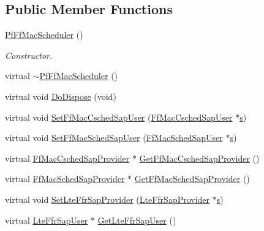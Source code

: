 \subsection*{Public Member Functions}
\begin{DoxyCompactItemize}
\item 
\hyperlink{classns3_1_1PfFfMacScheduler_ad972377fd4997d9bf0b8193e69f20a16}{Pf\+Ff\+Mac\+Scheduler} ()
\begin{DoxyCompactList}\small\item\em Constructor. \end{DoxyCompactList}\item 
virtual \hyperlink{classns3_1_1PfFfMacScheduler_a5393a928efa6e15a722b4017ce6e1722}{$\sim$\+Pf\+Ff\+Mac\+Scheduler} ()
\item 
virtual void \hyperlink{classns3_1_1PfFfMacScheduler_a8dcc458e09d58658d878ac38e6ab53b2}{Do\+Dispose} (void)
\item 
virtual void \hyperlink{classns3_1_1PfFfMacScheduler_a321a45d0b943975e8a4d6864e7d1c77a}{Set\+Ff\+Mac\+Csched\+Sap\+User} (\hyperlink{classns3_1_1FfMacCschedSapUser}{Ff\+Mac\+Csched\+Sap\+User} $\ast$\hyperlink{generate__test__data__lte__sinr_8m_ad83eeb3a142285d1243a08c6b7026df8}{s})
\item 
virtual void \hyperlink{classns3_1_1PfFfMacScheduler_a8a140242b29416a972e7cbec6437dda6}{Set\+Ff\+Mac\+Sched\+Sap\+User} (\hyperlink{classns3_1_1FfMacSchedSapUser}{Ff\+Mac\+Sched\+Sap\+User} $\ast$\hyperlink{generate__test__data__lte__sinr_8m_ad83eeb3a142285d1243a08c6b7026df8}{s})
\item 
virtual \hyperlink{classns3_1_1FfMacCschedSapProvider}{Ff\+Mac\+Csched\+Sap\+Provider} $\ast$ \hyperlink{classns3_1_1PfFfMacScheduler_abcd84721f95e8b9d01fb8f54f58b906b}{Get\+Ff\+Mac\+Csched\+Sap\+Provider} ()
\item 
virtual \hyperlink{classns3_1_1FfMacSchedSapProvider}{Ff\+Mac\+Sched\+Sap\+Provider} $\ast$ \hyperlink{classns3_1_1PfFfMacScheduler_a14eca80f3c7bcfbc6c05ad343f06f5cf}{Get\+Ff\+Mac\+Sched\+Sap\+Provider} ()
\item 
virtual void \hyperlink{classns3_1_1PfFfMacScheduler_afa1704390f12e82562177e34113df9ab}{Set\+Lte\+Ffr\+Sap\+Provider} (\hyperlink{classns3_1_1LteFfrSapProvider}{Lte\+Ffr\+Sap\+Provider} $\ast$\hyperlink{generate__test__data__lte__sinr_8m_ad83eeb3a142285d1243a08c6b7026df8}{s})
\item 
virtual \hyperlink{classns3_1_1LteFfrSapUser}{Lte\+Ffr\+Sap\+User} $\ast$ \hyperlink{classns3_1_1PfFfMacScheduler_a82ba8d180a3861f267f76d79c62a724b}{Get\+Lte\+Ffr\+Sap\+User} ()

\end{DoxyCompactItemize}
